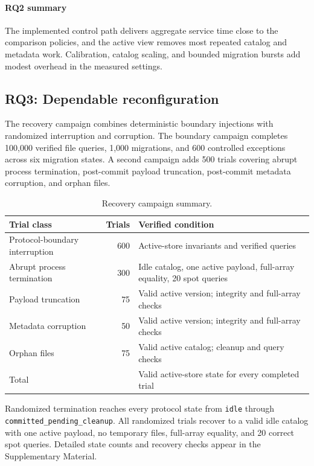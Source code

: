 \documentclass[final,5p,times,twocolumn,authoryear]{elsarticle}
\begin{document}
\paragraph{RQ2 summary}
The implemented control path delivers aggregate service time close to the comparison policies, and the active view removes most repeated catalog and metadata work. Calibration, catalog scaling, and bounded migration bursts add modest overhead in the measured settings.

\FloatBarrier
\subsection{RQ3: Dependable reconfiguration}

The recovery campaign combines deterministic boundary injections with randomized interruption and corruption. The boundary campaign completes 100,000 verified file queries, 1,000 migrations, and 600 controlled exceptions across six migration states. A second campaign adds 500 trials covering abrupt process termination, post-commit payload truncation, post-commit metadata corruption, and orphan files.

\begin{table}[H]
\centering
\caption{Recovery campaign summary.}
\label{tab:recovery_campaign}
\scriptsize
\begin{tabularx}{\columnwidth}{@{}p{}rX@{}}
\toprule
Trial class & Trials & Verified condition \\
\midrule
Protocol-boundary interruption & 600 & Active-store invariants and verified queries \\
Abrupt process termination & 300 & Idle catalog, one active payload, full-array equality, 20 spot queries \\
Payload truncation & 75 & Valid active version; integrity and full-array checks \\
Metadata corruption & 50 & Valid active version; integrity and full-array checks \\
Orphan files & 75 & Valid active catalog; cleanup and query checks \\
\midrule
Total & \CombinedRecoveryTrials{} & Valid active-store state for every completed trial \\
\bottomrule
\end{tabularx}
\end{table}

Randomized termination reaches every protocol state from \texttt{idle} through \texttt{committed\_pending\_cleanup}. All randomized trials recover to a valid idle catalog with one active payload, no temporary files, full-array equality, and 20 correct spot queries. Detailed state counts and recovery checks appear in the Supplementary Material.
\end{document}
